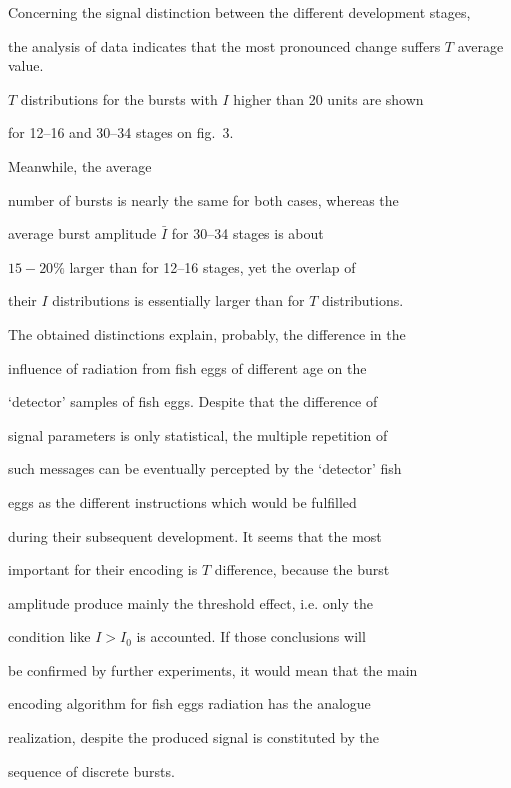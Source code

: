 Concerning the signal distinction between the different development stages,

the analysis of data indicates that the most pronounced change suffers $T$ average value.

 $T$ distributions for the bursts with $I$ higher than 20 units  are shown

  for 12--16 and 30--34 stages on fig.~3. 

  Meanwhile, the average

number of bursts is nearly the same for both cases, whereas the

average burst amplitude $\bar I$ for 30--34 stages is about

 $15{-}20\%$ larger than for 12--16 stages, yet the overlap of

 their $I$ distributions is essentially larger than for $T$ distributions.

The obtained distinctions explain, probably, the difference in the

influence of radiation from fish eggs of different age on the

`detector' samples of fish eggs. Despite that the difference of

signal parameters is only statistical, the multiple repetition of

such messages can be eventually percepted  by the `detector' fish

eggs as the different instructions which would be fulfilled

during their subsequent development. It seems that the most

important for their encoding is $T$ difference, because the burst

amplitude produce mainly the threshold effect, i.e. only the

condition like $I > I_0$ is accounted. If those conclusions will

be confirmed by further experiments, it would mean that the main

encoding algorithm for fish eggs radiation has the analogue

realization, despite the produced signal is constituted by the

sequence of discrete bursts.







\renewcommand{\refname}{REFERENCES}



